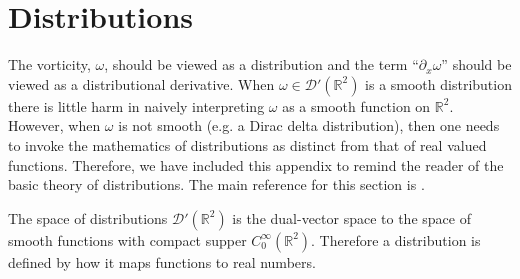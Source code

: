 \documentclass[12pt]{amsart}
\newcommand{\R}{\ensuremath{\mathbb{R}}}
\theoremstyle{remark}
\begin{document}
\appendix

\section{Distributions}
\label{sec:distributions}
The vorticity, $\omega$, should be viewed as a distribution
and the term ``$\partial_x \omega$'' should be viewed
as a distributional derivative.
When $\omega \in \mathcal{D}'(\R^2)$ is a smooth distribution there is little harm in naively interpreting $\omega$ as a smooth function on $\R^2$.
However, when $\omega$ is not smooth (e.g. a Dirac delta distribution),
then one needs to invoke the mathematics of distributions
as distinct from that of real valued functions.
Therefore, we have included this appendix to remind the reader of the basic theory of distributions.
The main reference for this section is \cite{Hormander2003}.

The space of distributions $\mathcal{D}'(\R^2)$ is the dual-vector space to the space of smooth functions with compact supper $C^\infty_0(\R^2)$.
Therefore a distribution is defined by how it maps functions to real numbers.
\end{document}

